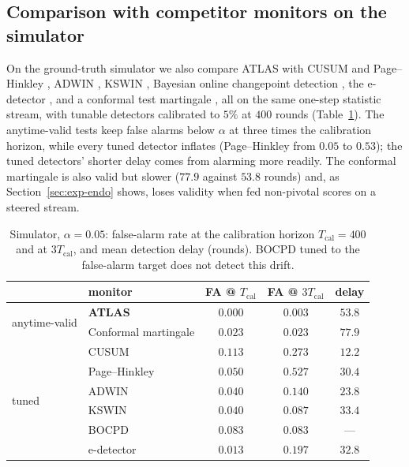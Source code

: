 

\subsection{Comparison with competitor monitors on the simulator}\label{sec:exp-baselines}

On the ground-truth simulator we also compare ATLAS with CUSUM and Page--Hinkley \citep{page1954cusum}, ADWIN \citep{bifet2007adwin}, KSWIN \citep{raab2020kswin}, Bayesian online changepoint detection \citep{adams2007bocpd}, the e-detector \citep{shin2024edetectors}, and a conformal test martingale \citep{vovk2003testing}, all on the same one-step statistic stream, with tunable detectors calibrated to $5\%$ at $400$ rounds (Table~\ref{tab:baselines}).
The anytime-valid tests keep false alarms below $\alpha$ at three times the calibration horizon, while every tuned detector inflates (Page--Hinkley from $0.05$ to $0.53$); the tuned detectors' shorter delay comes from alarming more readily. The conformal martingale is also valid but slower ($77.9$ against $53.8$ rounds) and, as
Section~\ref{sec:exp-endo} shows, loses validity when fed non-pivotal scores on a steered stream.

\begin{table}[t]\centering
\caption{Simulator, $\alpha=0.05$: false-alarm rate at the calibration horizon $T_{\mathrm{cal}}=400$ and at $3T_{\mathrm{cal}}$, and mean detection delay (rounds). BOCPD tuned to the false-alarm target does not detect this drift.}
\label{tab:baselines}
\small
\begin{tabular}{@{}llccc@{}}
\toprule
 & monitor & FA @ $T_{\mathrm{cal}}$ & FA @ $3T_{\mathrm{cal}}$ & delay \\
\midrule
\multirow{2}{*}{anytime-valid} & \textbf{ATLAS} & $\mathbf{0.000}$ & $\mathbf{0.003}$ & $53.8$ \\
 & Conformal martingale & $0.023$ & $0.023$ & $77.9$ \\
\midrule
\multirow{6}{*}{tuned} & CUSUM & $0.113$ & $0.273$ & $12.2$ \\
 & Page--Hinkley & $0.050$ & $0.527$ & $30.4$ \\
 & ADWIN & $0.040$ & $0.140$ & $23.8$ \\
 & KSWIN & $0.040$ & $0.087$ & $33.4$ \\
 & BOCPD & $0.083$ & $0.083$ & --- \\
 & e-detector & $0.013$ & $0.197$ & $32.8$ \\
\bottomrule
\end{tabular}
\end{table}

